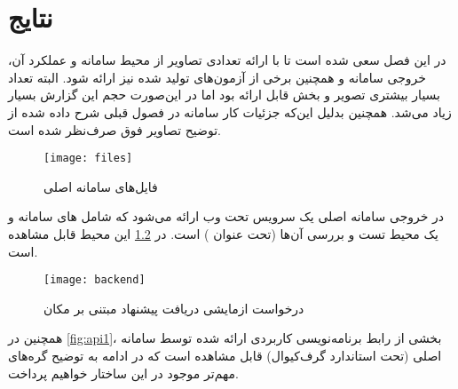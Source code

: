 \chapter{نتایج}

در این فصل سعی شده است تا با ارائه تعدادی تصاویر از محیط سامانه و عملکرد آن، خروجی سامانه و همچنین برخی از آزمون‌های تولید شده نیز ارائه شود. البته تعداد بسیار بیشتری تصویر و بخش قابل ارائه بود اما در این‌صورت حجم این گزارش بسیار زیاد می‌شد. همچنین  بدلیل این‌که جزئیات کار سامانه در فصول قبلی شرح داده شده از توضیح تصاویر فوق صرف‌نظر شده است.



\begin{figure}[H]
	\centering
	\texttt{[image: files]}
	\caption{فایل‌های سامانه اصلی}
	\label{fig:files}
\end{figure}


در خروجی سامانه اصلی یک سرویس تحت وب ارائه می‌شود که شامل های سامانه و یک محیط تست و بررسی آن‌ها (تحت عنوان ) است. در \cref{fig:backend} این محیط قابل مشاهده است.

\begin{figure}[H]
	\centering
	\texttt{[image: backend]}
	\caption{درخواست ازمایشی دریافت پیشنهاد مبتنی بر مکان}
	\label{fig:backend}
\end{figure}

همچنین در \cref{fig:api1}، بخشی از رابط برنامه‌نویسی کاربردی ارائه شده توسط سامانه اصلی (تحت استاندارد گرف‌کیوال) قابل مشاهده است که در ادامه به توضیح گره‌های مهم‌تر موجود در این ساختار خواهیم پرداخت.


